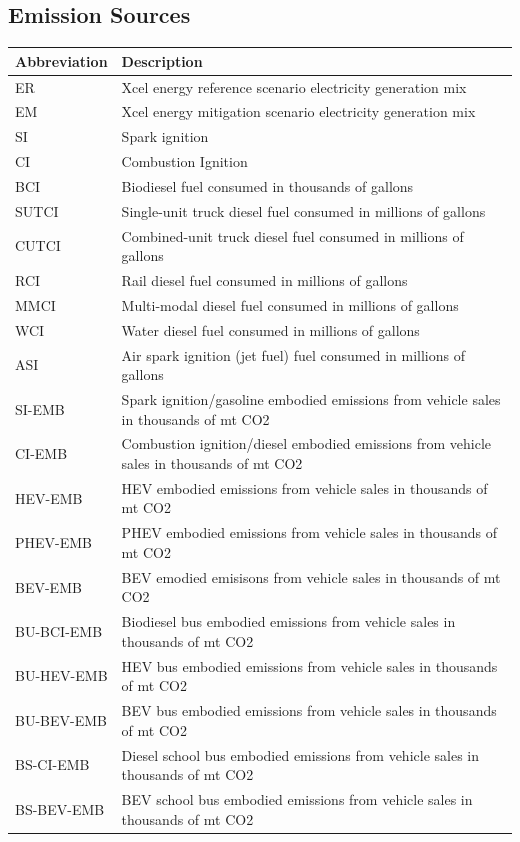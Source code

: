 \documentclass[
]{book}
\begin{document}
\hypertarget{emission-sources}{%
\subsection{Emission Sources}\label{emission-sources}}

\begin{longtable}{ll}
\toprule
Abbreviation & Description \\ 
\midrule
ER & Xcel energy reference scenario electricity generation mix \\ 
EM & Xcel energy mitigation scenario electricity generation mix \\ 
SI & Spark ignition \\ 
CI & Combustion Ignition \\ 
BCI & Biodiesel fuel consumed in thousands of gallons \\ 
SUTCI & Single-unit truck diesel fuel consumed in millions of gallons \\ 
CUTCI & Combined-unit truck diesel fuel consumed in millions of gallons \\ 
RCI & Rail diesel fuel consumed in millions of gallons \\ 
MMCI & Multi-modal diesel fuel consumed in millions of gallons \\ 
WCI & Water diesel fuel consumed in millions of gallons \\ 
ASI & Air spark ignition (jet fuel) fuel consumed in millions of gallons \\ 
SI-EMB & Spark ignition/gasoline embodied emissions from vehicle sales in thousands of mt CO2 \\ 
CI-EMB & Combustion ignition/diesel embodied emissions from vehicle sales in thousands of mt CO2 \\ 
HEV-EMB & HEV embodied emissions from vehicle sales in thousands of mt CO2 \\ 
PHEV-EMB & PHEV embodied emissions from vehicle sales in thousands of mt CO2 \\ 
BEV-EMB & BEV emodied emisisons from vehicle sales in thousands of mt CO2 \\ 
BU-BCI-EMB & Biodiesel bus embodied emissions from vehicle sales in thousands of mt CO2 \\ 
BU-HEV-EMB & HEV bus embodied emissions from vehicle sales in thousands of mt CO2 \\ 
BU-BEV-EMB & BEV bus embodied emissions from vehicle sales in thousands of mt CO2 \\ 
BS-CI-EMB & Diesel school bus embodied emissions from vehicle sales in thousands of mt CO2 \\ 
BS-BEV-EMB & BEV school bus embodied emissions from vehicle sales in thousands of mt CO2 \\ 
\bottomrule
\end{longtable}
\end{document}
